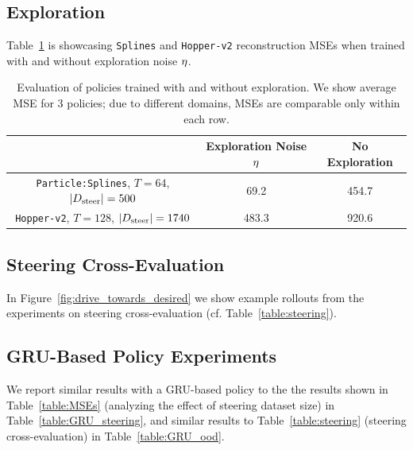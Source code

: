 \documentclass[nohyperref]{article}
\begin{document}
\subsection{Exploration}
Table~\ref{table:test_exploration} is showcasing \texttt{Splines} and \texttt{Hopper-v2} reconstruction MSEs when trained with and without exploration noise $\eta$.

\begin{table}[]
    \centering
    \caption{Evaluation of policies trained with and without exploration. We show average MSE for 3 policies; due to different domains, MSEs are comparable only within each row.  
    }
    \label{table:test_exploration}
    \begin{tabular}{ccc}
        \toprule
        \multicolumn{1}{c}{}  & Exploration Noise $\eta$ & No Exploration \\
        \midrule
        \texttt{Particle:Splines}, $T=64$, $|D_{\mathrm{steer}}| = 500$  & 69.2  & 454.7 \\
        \texttt{Hopper-v2}, $T=128$, $|D_{\mathrm{steer}}| = 1740$        & 483.3 & 920.6 \\
        \bottomrule
    \end{tabular}%
\end{table}

\subsection{Steering Cross-Evaluation}
\label{app:test_on_ood}
In Figure~\ref{fig:drive_towards_desired} we show example rollouts from the experiments on steering cross-evaluation (cf. Table~\ref{table:steering}).

\subsection{GRU-Based Policy Experiments}
We report similar results with a GRU-based policy to the the results shown in Table~\ref{table:MSEs} (analyzing the effect of steering dataset size) in Table~\ref{table:GRU_steering}, and similar results to Table~\ref{table:steering} (steering cross-evaluation) in Table~\ref{table:GRU_ood}.
\end{document}
